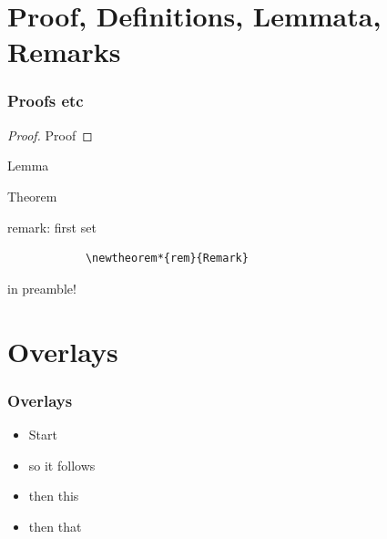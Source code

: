 \section{Proof, Definitions, Lemmata, Remarks}


\begin{frame}[fragile] %
	\frametitle{Proofs etc}

    \begin{proof}
        Proof
    \end{proof}
    
    \begin{lemma}[XY -- A dual zu YX]
        Lemma
    \end{lemma}
    
    \begin{theorem}
        Theorem
    \end{theorem}
    
     \begin{rem}
		remark: first set
		  \begin{verbatim}
		    \newtheorem*{rem}{Remark}
		  \end{verbatim}
		  in preamble! 
     \end{rem}
\end{frame}








\section{Overlays}


\begin{frame}
	\frametitle{Overlays}
   \begin{itemize}
        \item Start
        \item<2-> so it follows
        \item<3-> then this
        \item<4-> then that
   \end{itemize}
\end{frame}











